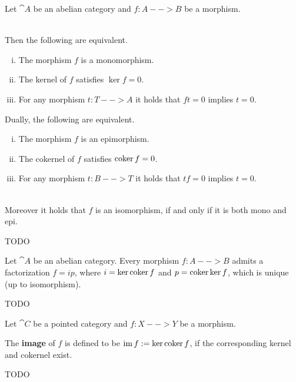 	\begin{proposition}
		Let $\cat{A}$ be an abelian category and $f:A-->B$ be a morphism.
		
		~\\
		Then the following are equivalent.
		\begin{enumerate}[(i)]
			\item{
				The morphism $f$ is a monomorphism.
			}
			\item{
				The kernel of $f$ satisfies $\ker f = 0$.
			}
			\item{
				For any morphism $t:T-->A$ it holds that $ft = 0$ implies $t = 0$.
			}
		\end{enumerate}
		Dually, the following are equivalent.
		\begin{enumerate}[(i)]
			\item{
				The morphism $f$ is an epimorphism.
			}
			\item{
				The cokernel of $f$ satisfies $\operatorname{coker} f = 0$.
			}
			\item{
				For any morphism $t:B-->T$ it holds that $tf = 0$ implies $t = 0$.
			}
		\end{enumerate}

		~\\
		Moreover it holds that $f$ is an isomorphism, if and only if it is both mono and epi.
	\end{proposition}
	\begin{sketch}
		TODO
	\end{sketch}

	\begin{theorem}
		Let $\cat{A}$ be an abelian category. Every morphism $f:A-->B$ admits a factorization $f=ip$, where $i = \ker \operatorname{coker} f$ and $p = \operatorname{coker} \ker f$, which is unique (up to isomorphism).
	\end{theorem}
	\begin{sketch}
		TODO
	\end{sketch}

	\begin{definition}[Image]
		Let $\cat{C}$ be a pointed category and $f:X-->Y$ be a morphism.

		The \textbf{image} of $f$ is defined to be $\operatorname{im} f := \ker \operatorname{coker} f$, if the corresponding kernel and cokernel exist.
	\end{definition}

	\begin{theorem}
		TODO
	\end{theorem}

